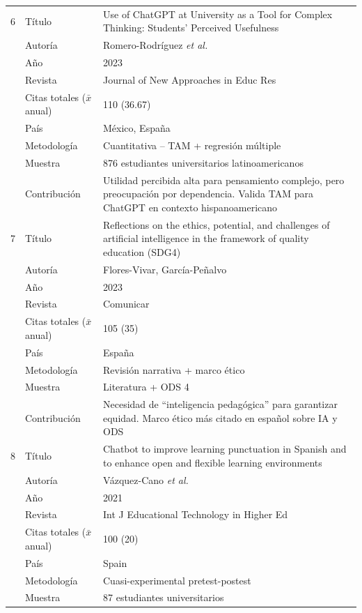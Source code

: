 \documentclass[spanish]{textolivre}
\begin{document}
{\begin{longtable}{@{}p{0.2cm}p{3cm}p{10cm}@{}}
\midrule
6 & Título  & Use of ChatGPT at University as a Tool for Complex Thinking: Students' Perceived Usefulness\\
  & Autoría & Romero-Rodríguez \textit{et al.}\\
  & Año     & 2023\\
  & Revista & Journal of New Approaches in Educ Res \\
  & Citas totales ($\bar{x}$ anual) & 110 (36.67)\\
  & País & México, España\\
  & Metodología &  Cuantitativa -- TAM + regresión múltiple\\
  & Muestra & 876 estudiantes universitarios latinoamericanos \\
  & Contribución & Utilidad percibida alta para pensamiento complejo, pero preocupación por dependencia. Valida TAM para ChatGPT en contexto hispanoamericano\\
\midrule
7 & Título  & Reflections on the ethics, potential, and challenges of artificial intelligence in the framework of quality education (SDG4)\\
  & Autoría & Flores-Vivar, García-Peñalvo \\
  & Año     & 2023\\
  & Revista & Comunicar\\
  & Citas totales ($\bar{x}$ anual) & 105 (35)\\
  & País &  España\\
  & Metodología & Revisión narrativa + marco ético \\
  & Muestra & Literatura + ODS 4  \\
  & Contribución & Necesidad de ``inteligencia pedagógica'' para garantizar equidad. Marco ético más citado en español sobre IA y ODS\\
\midrule
8 & Título  & Chatbot to improve learning punctuation in Spanish and to enhance open and flexible learning environments \\
  & Autoría & Vázquez-Cano \textit{et al.} \\
  & Año     & 2021\\
  & Revista & Int J Educational Technology in Higher Ed \\
  & Citas totales ($\bar{x}$ anual) & 100 (20) \\
  & País & Spain \\
  & Metodología & Cuasi-experimental pretest-postest \\
  & Muestra & 87 estudiantes universitarios \\

\end{longtable}}
\end{document}
